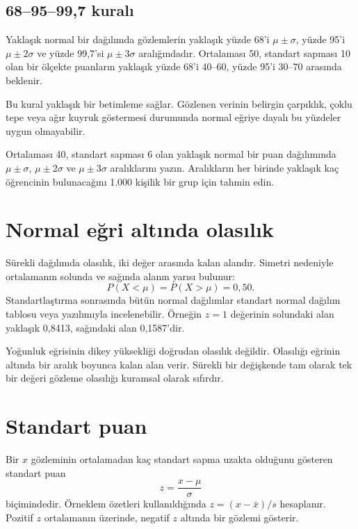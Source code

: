\subsection{68--95--99,7 kuralı}

Yaklaşık normal bir dağılımda gözlemlerin yaklaşık yüzde 68'i
$\mu\pm\sigma$, yüzde 95'i $\mu\pm2\sigma$ ve yüzde 99,7'si
$\mu\pm3\sigma$ aralığındadır. Ortalaması 50, standart sapması 10 olan bir
ölçekte puanların yaklaşık yüzde 68'i 40--60, yüzde 95'i 30--70 arasında
beklenir.

Bu kural yaklaşık bir betimleme sağlar. Gözlenen verinin belirgin çarpıklık,
çoklu tepe veya ağır kuyruk göstermesi durumunda normal eğriye dayalı bu
yüzdeler uygun olmayabilir.

\begin{etkinlik}
Ortalaması 40, standart sapması 6 olan yaklaşık normal bir puan dağılımında
$\mu\pm\sigma$, $\mu\pm2\sigma$ ve $\mu\pm3\sigma$ aralıklarını yazın.
Aralıkların her birinde yaklaşık kaç öğrencinin bulunacağını 1.000 kişilik bir
grup için tahmin edin.
\end{etkinlik}

\section{Normal eğri altında olasılık}

Sürekli dağılımda olasılık, iki değer arasında kalan alandır. Simetri
nedeniyle ortalamanın solunda ve sağında alanın yarısı bulunur:
\[
P(X<\mu)=P(X>\mu)=0{,}50.
\]
Standartlaştırma sonrasında bütün normal dağılımlar standart normal dağılım
tablosu veya yazılımıyla incelenebilir. Örneğin $z=1$ değerinin solundaki alan
yaklaşık 0,8413, sağındaki alan 0,1587'dir.

\begin{mistakebox}
Yoğunluk eğrisinin dikey yüksekliği doğrudan olasılık değildir. Olasılığı
eğrinin altında bir aralık boyunca kalan alan verir. Sürekli bir değişkende
tam olarak tek bir değeri gözleme olasılığı kuramsal olarak sıfırdır.
\end{mistakebox}

\section{Standart puan}

Bir $x$ gözleminin ortalamadan kaç standart sapma uzakta olduğunu gösteren
standart puan
\[
z=\frac{x-\mu}{\sigma}
\]
biçimindedir. Örneklem özetleri kullanıldığında $z=(x-\bar{x})/s$ hesaplanır.
Pozitif $z$ ortalamanın üzerinde, negatif $z$ altında bir gözlemi gösterir.

